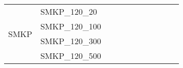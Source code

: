 \begin{table}[]
{\begin{tabular}{|c|l|ll|ll|ll|l|l|l|}
\hline
			\multirow{4}{*}{SMKP}   & SMKP\_120\_20                 &                                   &                                  &                           &                          &                           &                          &                                       &                               & \\
			& SMKP\_120\_100                &                                   &                                  &                           &                          &                           &                          &                                       &                               & \\
			& SMKP\_120\_300                &                                   &                                  &                           &                          &                           &                          &                                       &                               & \\
			& SMKP\_120\_500                &                                   &                                  &                           &                          &                           &                          &                                       &                               & \\

\end{tabular}}
\end{table}
